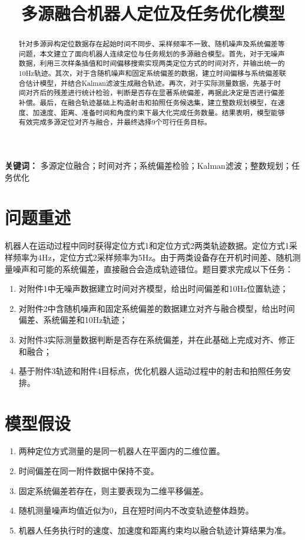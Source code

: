 \documentclass[UTF8,a4paper,12pt]{ctexart}
\title{\heiti 多源融合机器人定位及任务优化模型}
\author{}
\date{}
\begin{document}
\maketitle

\begin{abstract}
针对多源异构定位数据存在起始时间不同步、采样频率不一致、随机噪声及系统偏差等问题，本文建立了面向机器人连续定位与任务规划的多源融合模型。首先，对于无噪声数据，利用三次样条插值和时间偏移搜索实现两类定位方式的时间对齐，并输出统一的10Hz轨迹。其次，对于含随机噪声和固定系统偏差的数据，建立时间偏移与系统偏差联合估计模型，并结合Kalman滤波生成融合轨迹。再次，对于实际测量数据，先基于时间对齐后的残差进行统计检验，判断是否存在显著系统偏差，再据此决定是否进行偏差补偿。最后，在融合轨迹基础上构造射击和拍照任务候选集，建立整数规划模型，在速度、加速度、距离、准备时间和角度约束下最大化完成任务数量。结果表明，模型能够有效完成多源定位对齐与融合，并最终选择9个可行任务目标。
\end{abstract}

\noindent\textbf{关键词：} 多源定位融合；时间对齐；系统偏差检验；Kalman滤波；整数规划；任务优化

\section{问题重述}
机器人在运动过程中同时获得定位方式1和定位方式2两类轨迹数据。定位方式1采样频率为4Hz，定位方式2采样频率为5Hz。由于两类设备存在开机时间差、随机测量噪声和可能的系统偏差，直接融合会造成轨迹错位。题目要求完成以下任务：

\begin{enumerate}
    \item 对附件1中无噪声数据建立时间对齐模型，给出时间偏差和10Hz位置轨迹；
    \item 对附件2中含随机噪声和固定系统偏差的数据建立对齐与融合模型，给出时间偏差、系统偏差和10Hz轨迹；
    \item 对附件3实际测量数据判断是否存在系统偏差，并在此基础上完成对齐、修正和融合；
    \item 基于附件3轨迹和附件4目标点，优化机器人运动过程中的射击和拍照任务安排。
\end{enumerate}

\section{模型假设}
\begin{enumerate}
    \item 两种定位方式测量的是同一机器人在平面内的二维位置。
    \item 时间偏差在同一附件数据中保持不变。
    \item 固定系统偏差若存在，则主要表现为二维平移偏差。
    \item 随机测量噪声均值近似为0，且在短时间内不改变轨迹整体趋势。
    \item 机器人任务执行时的速度、加速度和距离约束均以融合轨迹计算结果为准。
\end{enumerate}
\end{document}

